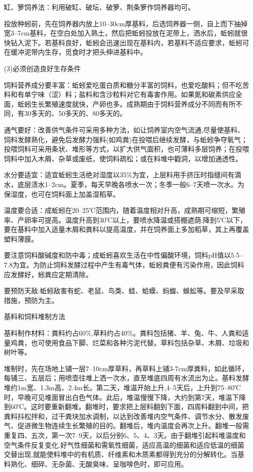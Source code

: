 \documentclass{ctexbook}
\begin{document}
缸、箩饲养法：利用破缸、破坛、破箩、荆条箩作饲养器均可。

投放种蚓前，先在饲养器内放上10--30cm厚基料，后选饲养器一侧，自上而下抽掉宽3--7cm基料，在空白处加入熟土，然后把蚯蚓投放在泥带上，洒水后，蚯蚓就很快钻入泥下。若基料良好，蚯蚓会迅速出现在基料内，若基料不适应要求，蚯蚓可在缓冲泥带内生存，觅食时才把头伸进基料中。

(3)必须创造良好生存条件

饲料营养成分要丰富：蚯蚓爱吃蛋白质和糖分丰富的饲料，也爱吃酸料；但不吃苦料和有单宁味（涩）料；盐料和含沙粒料对它有毒害作用。如果氮和碳素供应全面，蚯蚓生长繁殖速度就快，产卵也多。成熟期由于饲料营养成分不同而有所不同，有30多天的、50多天的、80多天的。

通气要好：改善供气条件可采用多种方法，如让饲养室内空气流通,尽量使基料、饲料发酵熟化，避免后发酵力强料(如鸡粪)在投喂后继续发酵，与蚯蚓争夺氧气；投喂饲料可采用条状、堆形等方式，以扩大供气面积，也可薄料多层饲养；在投喂饲料中加入木屑、杂草或废纸，使饲料疏松；或在料堆中戳洞，以增加通透性。

水分要适宜：适宜蚯蚓生活绝对湿度以35\%为宜，上层料用手挤压时指缝间有滴水，底层渍水1--2cm。夏季，每天早晚各喷水一次；冬季一般6--7天喷一次水。为保湿度，也可在饲料面上加盖湿稻草。

温度要合适：成蚯蚓在20--25℃范围内，随着温度相对升高，成熟期可缩短，繁殖率、产卵率可提高。温度升高到30℃以上，要喷水降温或搭棚遮荫;降到5℃以下，要在基料中加入适量木屑和粪料以提高温度，并在饲养面上多加稻草，其上再覆盖塑料薄膜。

要注意饲料酸碱度和防中毒；成蚯蚓喜欢生活在中性偏酸环境，饲料pH值以5.5--7.8为宜。为防止饲料发酵过程中产生有毒气体，蚯蚓粪便有污染作用，因此饲料应发酵好，蚓粪应定期清除。

要预防天敌:蚯蚓敌害有蛇、老鼠、鸟类、蛙、蛤蟆、蚂蝗、蜈蚣等。要及早采取措施，预防为主。

基料和饲料堆制方法

基料制作材料：粪料约占60\%,草料约占40\%。粪料包括猪、羊、兔、牛、人粪和适量鸡粪，也可使用食品下脚、烂菜和各种污泥代替。草料包括杂草、木屑、垃圾和树叶等。

堆制时，先在场地上铺一层7--10cm厚草料，再草料上铺3-7cm厚粪料，如此循环，每铺三、五层后；用喷壶往堆上洒一次水，直至堆底四周有水流出为止。基料发酵堆约1m宽、1.3m高、2.4m长。第二天，堆温开始上升,4--5天后，上升到75--80℃时，早晚可见堆面冒出白色气体。此后，堆温慢慢下降，大约到第7天，堆温下降到60℃。这时要重新翻堆。翻堆时，要求把上层料翻到下面，四周料翻到中间，把粪料抖松拌和，过干粪块加水调制，以达到改善堆内空气条件、调节水分、散发废气、促进微生物连续生长繁殖的目的。翻堆后，堆内温度会再次上升。翻堆一般需重复四、五次，第一次7--9天，以后分别6、5、4、3天。由于翻堆引起料堆温度和空气条件反复变化.好气性细菌和需氧性细菌，适应高温的细菌和适应低温的细菌交替出现,就能使料堆中的有机质、纤维素和木质素都得到充分的分解转化。当基料熟化、细碎、无杂菌、无酸臭味、呈咖啡色时，即可应用。
\end{document}

